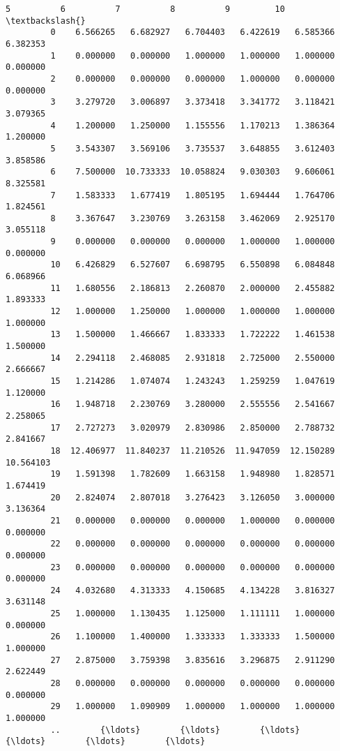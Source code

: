\documentclass[11pt]{article}
\begin{document}
\begin{Verbatim}[commandchars=\\\{\}]
                     5          6          7          8          9         10  \textbackslash{}
         0    6.566265   6.682927   6.704403   6.422619   6.585366   6.382353   
         1    0.000000   0.000000   1.000000   1.000000   1.000000   0.000000   
         2    0.000000   0.000000   0.000000   1.000000   0.000000   0.000000   
         3    3.279720   3.006897   3.373418   3.341772   3.118421   3.079365   
         4    1.200000   1.250000   1.155556   1.170213   1.386364   1.200000   
         5    3.543307   3.569106   3.735537   3.648855   3.612403   3.858586   
         6    7.500000  10.733333  10.058824   9.030303   9.606061   8.325581   
         7    1.583333   1.677419   1.805195   1.694444   1.764706   1.824561   
         8    3.367647   3.230769   3.263158   3.462069   2.925170   3.055118   
         9    0.000000   0.000000   0.000000   1.000000   1.000000   0.000000   
         10   6.426829   6.527607   6.698795   6.550898   6.084848   6.068966   
         11   1.680556   2.186813   2.260870   2.000000   2.455882   1.893333   
         12   1.000000   1.250000   1.000000   1.000000   1.000000   1.000000   
         13   1.500000   1.466667   1.833333   1.722222   1.461538   1.500000   
         14   2.294118   2.468085   2.931818   2.725000   2.550000   2.666667   
         15   1.214286   1.074074   1.243243   1.259259   1.047619   1.120000   
         16   1.948718   2.230769   3.280000   2.555556   2.541667   2.258065   
         17   2.727273   3.020979   2.830986   2.850000   2.788732   2.841667   
         18  12.406977  11.840237  11.210526  11.947059  12.150289  10.564103   
         19   1.591398   1.782609   1.663158   1.948980   1.828571   1.674419   
         20   2.824074   2.807018   3.276423   3.126050   3.000000   3.136364   
         21   0.000000   0.000000   0.000000   1.000000   0.000000   0.000000   
         22   0.000000   0.000000   0.000000   0.000000   0.000000   0.000000   
         23   0.000000   0.000000   0.000000   0.000000   0.000000   0.000000   
         24   4.032680   4.313333   4.150685   4.134228   3.816327   3.631148   
         25   1.000000   1.130435   1.125000   1.111111   1.000000   0.000000   
         26   1.100000   1.400000   1.333333   1.333333   1.500000   1.000000   
         27   2.875000   3.759398   3.835616   3.296875   2.911290   2.622449   
         28   0.000000   0.000000   0.000000   0.000000   0.000000   0.000000   
         29   1.000000   1.090909   1.000000   1.000000   1.000000   1.000000   
         ..        {\ldots}        {\ldots}        {\ldots}        {\ldots}        {\ldots}        {\ldots}   

\end{Verbatim}
\end{document}
